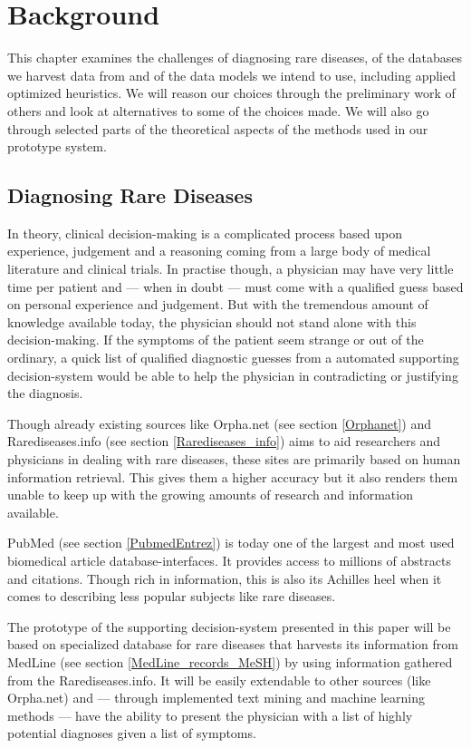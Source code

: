 \chapter{Background\label{Background}}

This chapter examines the challenges of diagnosing rare diseases, of
the databases we harvest data from and of the data models we intend to
use, including applied optimized heuristics. We will reason our
choices through the preliminary work of others and look at
alternatives to some of the choices made. We will also go through
selected parts of the theoretical aspects of the methods used in our prototype
system.

\section{Diagnosing Rare Diseases}

In theory, clinical decision-making is a complicated process based upon
experience, judgement and a reasoning coming from a large body of
medical literature and clinical trials. In practise though, a
physician may have very little time per patient and --- when in doubt
--- must come with a qualified guess based on personal experience and
judgement. But with the tremendous amount of knowledge available today, the
physician should not stand alone with this decision-making. If the
symptoms of the patient seem strange or out of the ordinary, a quick
list of qualified diagnostic guesses from a automated supporting
decision-system would be able to help the physician in contradicting or
justifying the diagnosis.

Though already existing sources like Orpha.net (see section
\ref{Orphanet}) and Rarediseases.info (see section
\ref{Rarediseases_info}) aims to aid researchers and physicians in
dealing with rare diseases, these sites are primarily based on human
information retrieval. This gives them a higher accuracy
 but it
also renders them unable to keep up with the growing amounts of
research and information available.

PubMed (see section \ref{PubmedEntrez}) is today one of the largest and most used
biomedical article database-interfaces. It provides access to millions
of abstracts and citations. Though rich in information, this is
also its Achilles heel when it comes to describing less popular
subjects like rare diseases.

The prototype of the supporting decision-system presented in this
paper will be based on specialized database for rare diseases that
harvests its information from MedLine (see section
\ref{MedLine_records_MeSH}) by using information gathered from the
Rarediseases.info. It will be easily extendable to other sources (like
Orpha.net) and --- through implemented text mining and machine
learning methods --- have the ability to present the physician with a
list of highly potential diagnoses given a list of symptoms.

